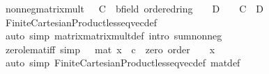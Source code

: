 \begin{isabellebody}
\endisatagproof
{\isafoldproof}%
%
\isadelimproof
\isanewline
%
\endisadelimproof
\isanewline
{}\isamarkupfalse%
\ nonneg{\isacharunderscore}{\kern0pt}matrix{\isacharunderscore}{\kern0pt}mult{\isacharcolon}{\kern0pt}\ {\isachardoublequoteopen}{}\ {\isasymle}\ {\isacharparenleft}{\kern0pt}C\ {\isacharcolon}{\kern0pt}{\isacharcolon}{\kern0pt}\ {\isacharparenleft}{\kern0pt}{\isacharprime}{\kern0pt}b{\isacharcolon}{\kern0pt}{\isacharcolon}{\kern0pt}{\isacharbraceleft}{\kern0pt}field{\isacharcomma}{\kern0pt}\ ordered{\isacharunderscore}{\kern0pt}ring{\isacharbraceright}{\kern0pt}{\isacharparenright}{\kern0pt}{\isacharcircum}{\kern0pt}{\isacharunderscore}{\kern0pt}{\isacharcircum}{\kern0pt}{\isacharunderscore}{\kern0pt}{\isacharparenright}{\kern0pt}\ {\isasymLongrightarrow}\ {}\ {\isasymle}\ D\ {\isasymLongrightarrow}\ {}\ {\isasymle}\ C\ {\isacharasterisk}{\kern0pt}{\isacharasterisk}{\kern0pt}\ D{\isachardoublequoteclose}\isanewline
%
\isadelimproof
\ \ %
\endisadelimproof
%
\isatagproof
{}\isamarkupfalse%
\ Finite{\isacharunderscore}{\kern0pt}Cartesian{\isacharunderscore}{\kern0pt}Product{\isachardot}{\kern0pt}less{\isacharunderscore}{\kern0pt}eq{\isacharunderscore}{\kern0pt}vec{\isacharunderscore}{\kern0pt}def\isanewline
\ \ \isamarkupfalse%
\ {\isacharparenleft}{\kern0pt}auto\ simp{\isacharcolon}{\kern0pt}\ matrix{\isacharunderscore}{\kern0pt}matrix{\isacharunderscore}{\kern0pt}mult{\isacharunderscore}{\kern0pt}def\ intro{\isacharbang}{\kern0pt}{\isacharcolon}{\kern0pt}\ sum{\isacharunderscore}{\kern0pt}nonneg{\isacharparenright}{\kern0pt}%
\endisatagproof
{\isafoldproof}%
%
\isadelimproof
\isanewline
%
\endisadelimproof
\isanewline
{}\isamarkupfalse%
\ zero{\isacharunderscore}{\kern0pt}le{\isacharunderscore}{\kern0pt}mat{\isacharunderscore}{\kern0pt}iff\ {\isacharbrackleft}{\kern0pt}simp{\isacharbrackright}{\kern0pt}{\isacharcolon}{\kern0pt}\ {\isachardoublequoteopen}{}\ {\isasymle}\ mat\ {\isacharparenleft}{\kern0pt}x\ {\isacharcolon}{\kern0pt}{\isacharcolon}{\kern0pt}\ {\isacharprime}{\kern0pt}c\ {\isacharcolon}{\kern0pt}{\isacharcolon}{\kern0pt}\ {\isacharbraceleft}{\kern0pt}zero{\isacharcomma}{\kern0pt}\ order{\isacharbraceright}{\kern0pt}{\isacharparenright}{\kern0pt}\ {\isasymlongleftrightarrow}\ {}\ {\isasymle}\ x{\isachardoublequoteclose}\isanewline
%
\isadelimproof
\ \ %
\endisadelimproof
%
\isatagproof
{}\isamarkupfalse%
\ {\isacharparenleft}{\kern0pt}auto\ simp{\isacharcolon}{\kern0pt}\ Finite{\isacharunderscore}{\kern0pt}Cartesian{\isacharunderscore}{\kern0pt}Product{\isachardot}{\kern0pt}less{\isacharunderscore}{\kern0pt}eq{\isacharunderscore}{\kern0pt}vec{\isacharunderscore}{\kern0pt}def\ mat{\isacharunderscore}{\kern0pt}def{\isacharparenright}{\kern0pt}%

\end{isabellebody}
